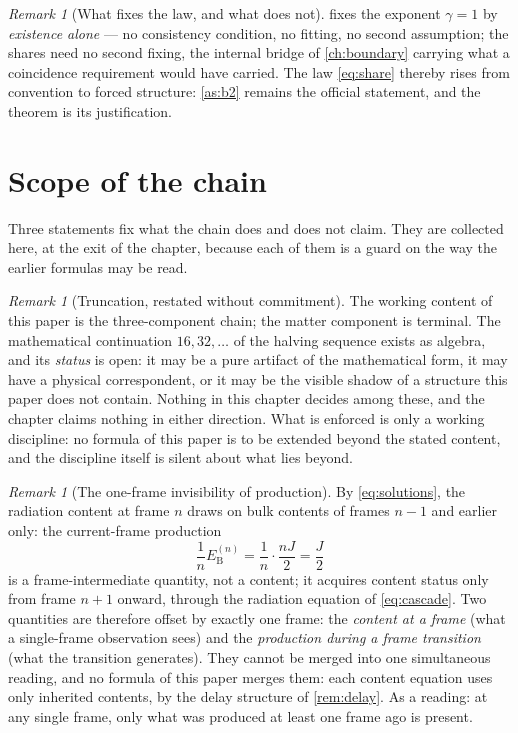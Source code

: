 \documentclass[11pt]{amsbook}
\theoremstyle{plain}
\theoremstyle{definition}
\theoremstyle{remark}
\newtheorem{remark}[theorem]{Remark}
\begin{document}
\begin{remark}[What fixes the law, and what does not]\label{rem:gamma-one}
 fixes the exponent $\gamma = 1$ by \emph{existence alone} --- no consistency condition, no fitting, no second assumption; the shares need no second fixing, the internal bridge of \cref{ch:boundary} carrying what a coincidence requirement would have carried. The law \cref{eq:share} thereby rises from convention to forced structure: \cref{as:b2} remains the official statement, and the theorem is its justification.
\end{remark}

\section{Scope of the chain}\label{sec:cascade-scope}

Three statements fix what the chain does and does not claim. They are collected here, at the exit of the chapter, because each of them is a guard on the way the earlier formulas may be read.

\begin{remark}[Truncation, restated without commitment]\label{rem:truncation-restated}
The working content of this paper is the three-component chain; the matter component is terminal. The mathematical continuation $16, 32, \ldots$ of the halving sequence exists as algebra, and its \emph{status} is open: it may be a pure artifact of the mathematical form, it may have a physical correspondent, or it may be the visible shadow of a structure this paper does not contain. Nothing in this chapter decides among these, and the chapter claims nothing in either direction. What is enforced is only a working discipline: no formula of this paper is to be extended beyond the stated content, and the discipline itself is silent about what lies beyond.
\end{remark}

\begin{remark}[The one-frame invisibility of production]\label{rem:invisibility}
By \cref{eq:solutions}, the radiation content at frame $n$ draws on bulk contents of frames $n-1$ and earlier only: the current-frame production
\begin{equation}\label{eq:production}
\frac{1}{n}E_{\mathrm B}^{(n)} = \frac{1}{n}\cdot\frac{nJ}{2} = \frac{J}{2}
\end{equation}
is a frame-intermediate quantity, not a content; it acquires content status only from frame $n+1$ onward, through the radiation equation of \cref{eq:cascade}. Two quantities are therefore offset by exactly one frame: the \emph{content at a frame} (what a single-frame observation sees) and the \emph{production during a frame transition} (what the transition generates). They cannot be merged into one simultaneous reading, and no formula of this paper merges them: each content equation uses only inherited contents, by the delay structure of \cref{rem:delay}. As a reading: at any single frame, only what was produced at least one frame ago is present.
\end{remark}
\end{document}
